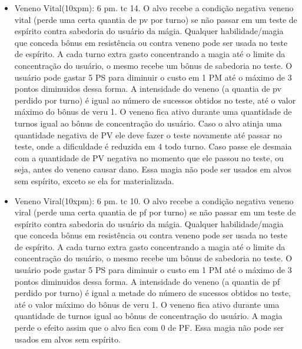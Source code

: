 \begin{itemize}
	\item Veneno Vital(10xpm): 6 pm. tc 14.\newline
O alvo recebe a condição negativa veneno vital (perde uma certa quantia de pv por turno) se não passar em um teste de espírito contra sabedoria do usuário da mágia. Qualquer habilidade/magia que conceda bônus em resistência ou contra veneno pode ser usada no teste de espírito. A cada turno extra gasto concentrando a magia até o limite da concentração do usuário, o mesmo recebe um bônus de sabedoria no teste. O usuário pode gastar 5 PS para diminuir o custo em 1 PM até o máximo de 3 pontos diminuidos dessa forma. A intensidade do veneno (a quantia de pv perdido por turno) é igual ao número de sucessos obtidos no teste, até o valor máximo do bônus de veru 1. O veneno fica ativo durante uma quantidade de turnos igual ao bônus de concentração do usuário. Caso o alvo atinja uma quantidade negativa de PV ele deve fazer o teste novamente até passar no teste, onde a dificuldade é reduzida em 4 todo turno. Caso passe ele desmaia com a quantidade de PV negativa no momento que ele passou no teste, ou seja, antes do veneno causar dano. Essa magia não pode ser usados em alvos sem espírito, exceto se ela for materializada.

	\item Veneno Viral(10xpm): 6 pm. tc 10.\newline
O alvo recebe a condição negativa veneno viral (perde uma certa quantia de pf por turno) se não passar em um teste de espírito contra sabedoria do usuário da mágia. Qualquer habilidade/magia que conceda bônus em resistência ou contra veneno pode ser usada no teste de espírito. A cada turno extra gasto concentrando a magia até o limite da concentração do usuário, o mesmo recebe um bônus de sabedoria no teste. O usuário pode gastar 5 PS para diminuir o custo em 1 PM até o máximo de 3 pontos diminuidos dessa forma. A intensidade do veneno (a quantia de pf perdido por turno) é igual a metade do número de sucessos obtidos no teste, até o valor máximo do bônus de veru 1. O veneno fica ativo durante uma quantidade de turnos igual ao bônus de concentração do usuário. A magia perde o efeito assim que o alvo fica com 0 de PF. Essa magia não pode ser usados em alvos sem espírito.


\end{itemize}
